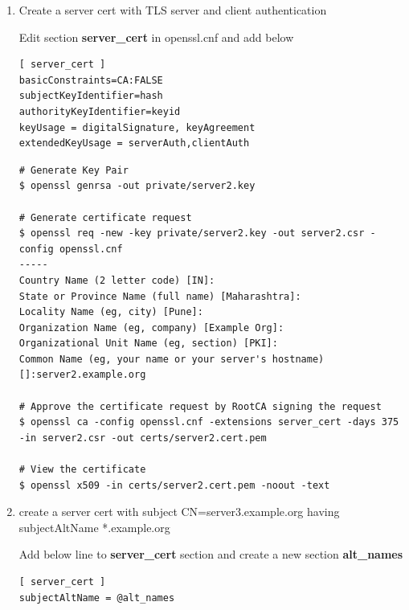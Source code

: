 \documentclass[12pt]{report}
\begin{document}
\begin{enumerate}[label*=\arabic*.]
\begin{lstlisting}[style=bashInputStyle]
# Generate Certificate request
$ openssl req -new -key private/pkiuser4.key -out pkiuser4.csr -config openssl.cnf

# Approve the certificate request by Example subca1.1.1 signing the request
$ openssl ca -keyfile private/subca1.1.1.key \
    -cert certs/subca1.1.1.cert.pem -config openssl.cnf \
    -extensions usr_cert -days 375 -in pkiuser4.csr \
    -out certs/pkiuser4.cert.pem

# View the certificate 
$ openssl x509 -in certs/pkiuser4.cert.pem -noout -text
        \end{lstlisting}

    \item Create a server cert with TLS server and client authentication

        Edit section \textbf{server\_cert} in openssl.cnf and add below
        \begin{lstlisting}
[ server_cert ]
basicConstraints=CA:FALSE
subjectKeyIdentifier=hash
authorityKeyIdentifier=keyid
keyUsage = digitalSignature, keyAgreement
extendedKeyUsage = serverAuth,clientAuth
        \end{lstlisting}
        \begin{lstlisting}[style=bashInputStyle]
# Generate Key Pair
$ openssl genrsa -out private/server2.key        

# Generate certificate request
$ openssl req -new -key private/server2.key -out server2.csr -config openssl.cnf
-----
Country Name (2 letter code) [IN]:
State or Province Name (full name) [Maharashtra]:
Locality Name (eg, city) [Pune]:
Organization Name (eg, company) [Example Org]:
Organizational Unit Name (eg, section) [PKI]:
Common Name (eg, your name or your server's hostname) []:server2.example.org

# Approve the certificate request by RootCA signing the request
$ openssl ca -config openssl.cnf -extensions server_cert -days 375 -in server2.csr -out certs/server2.cert.pem

# View the certificate
$ openssl x509 -in certs/server2.cert.pem -noout -text
        \end{lstlisting}

    \item create a server cert with subject CN=server3.example.org having subjectAltName *.example.org
        
        Add below line to \textbf{server\_cert} section and create a new section \textbf{alt\_names}
        \begin{lstlisting}
[ server_cert ]
subjectAltName = @alt_names


\end{lstlisting}
\end{enumerate}
\end{document}
